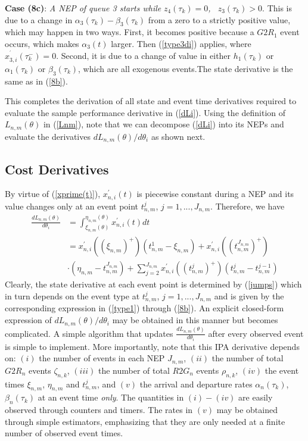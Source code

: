 \documentclass{ifacconf}\usepackage{graphicx}
\begin{document}
\textbf{Case (8c)}: \emph{A NEP of queue 3 starts while }$z_{4}(\tau_{k})=0$\emph{, \ }$z_{3}(\tau_{k})>0$. This is due to a change in $\alpha
_{3}(\tau_{k})-\beta_{3}(\tau_{k})$ from a zero to a strictly positive value,
which may happen in two ways. First, it becomes positive because a $G2R_{1}$
event occurs, which makes $\alpha_{3}(t)$ larger. Then (\ref{type3di})
applies, where $x_{3,i}^{^{\prime}}(\tau_{k}^{-})=0$. Second, it is due to a
change of value in either $h_{1}(\tau_{k})$ or $\alpha_{1}(\tau_{k})$ or
$\beta_{3}(\tau_{k})$, which are all exogenous events.The state derivative is
the same as in (\ref{8b}).

This completes the derivation of all state and event time derivatives required
to evaluate the sample performance derivative in (\ref{dLi}). Using the
definition of $L_{n,m}(\theta)$ in (\ref{Lnm}), note that we can decompose
(\ref{dLi}) into its NEPs and evaluate the derivatives $dL_{n,m}(\theta)/d\theta_{i}$ as shown next.

\subsection{Cost Derivatives}

By virtue of (\ref{xprime(t)}), $x_{n,i}^{\prime}(t)$ is piecewise constant
during a NEP and its value changes only at an event point $t_{n,m}^{j}$,
$j=1,...,J_{n,m}$. Therefore, we have
\begin{align}
\frac{dL_{n,m}(\theta)}{d\theta_{i}} &  =\int\nolimits_{\xi_{n,m}(\theta
)}^{\eta_{n,m}(\theta)}x_{n,i}^{\prime}(t)dt\nonumber\\
&  =x_{n,i}^{\prime}((\xi_{n,m})^{+})(t_{n,m}^{1}-\xi_{n,m})+x_{n,i}^{\prime
}((t_{n,m}^{J_{n,m}})^{+})\nonumber\\
&  \cdot(\eta_{n,m}-t_{n,m}^{J_{n,m}})+\sum\limits_{j=2}^{J_{n,m}}x_{n,i}^{\prime}((t_{n,m}^{j})^{+})(t_{n,m}^{j}-t_{n,m}^{j-1})\label{costDrtv}\end{align}
Clearly, the state derivative at each event point is determined by
(\ref{jumps}) which in turn depends on the event type at $t_{n,m}^{j}$,
$j=1,...,J_{n,m}$ and is given by the corresponding expression in
(\ref{type1}) through (\ref{8b}). An explicit closed-form expression of
$dL_{n,m}(\theta)/d\theta_{i}$ may be obtained in this manner but becomes
complicated. A simple algorithm that updates $\frac{dL_{n,m}(\theta)}{d\theta_{i}}$ after every observed event is simple to implement. More
importantly, note that this IPA derivative depends on: $(i)$ the number of
events in each NEP $J_{n,m}$, $(ii)$ the number of total $G2R_{n}$ events
$\zeta_{n,k}$, $(iii)$ the number of total $R2G_{n}$ events $\rho_{n,k}$,
$(iv)$ the event times $\xi_{n,m}$, $\eta_{n,m}$ and $t_{n,m}^{j}$, and $(v)$
the arrival and departure rates $\alpha_{n}(\tau_{k})$, $\beta_{n}(\tau_{k})$
at an event time \emph{only}. The quantities in $(i)-(iv)$ are easily observed
through counters and timers. The rates in $(v)$ may be obtained through simple
estimators, emphasizing that they are only needed at a finite number of
observed event times.
\end{document}
